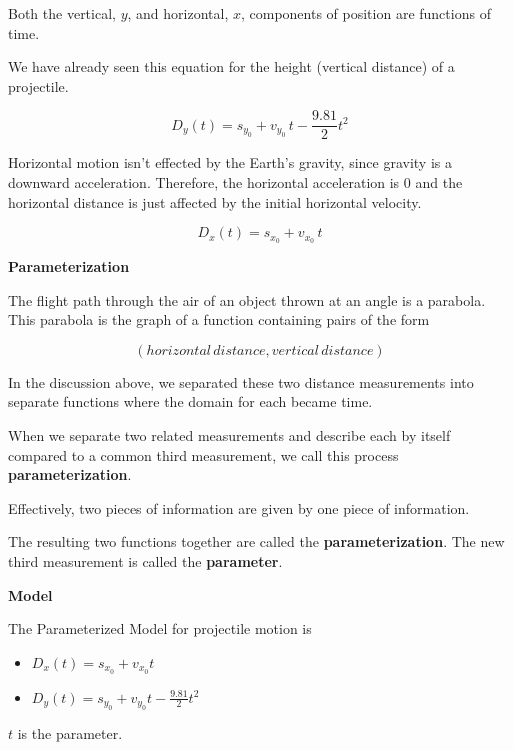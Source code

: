\documentclass{ximera}
\begin{document}
Both the vertical, $y$, and horizontal, $x$, components of position are functions of time.

We have already seen this equation for the height (vertical distance) of a projectile.

\[ 
D_y(t) = s_{y_0} + v_{y_0} \, t - \frac{9.81}{2} t^2  
\]

Horizontal motion isn't effected by the Earth's gravity, since gravity is a downward acceleration. Therefore, the horizontal acceleration is $0$ and the horizontal distance is just affected by the initial horizontal velocity.


\[ 
D_x(t) = s_{x_0} + v_{x_0} \, t  
\]






\begin{definition} \textbf{\textcolor{green!50!black}{Parameterization}} 

The flight path through the air of an object thrown at an angle is a parabola.  This parabola is the graph of a function containing pairs of the form 

\[ (horizontal \, distance, vertical \,distance) \]

In the discussion above, we separated these two distance measurements into separate functions where the domain for each became time.



When we separate two related measurements and describe each by itself compared to a common third measurement, we call this process \textbf{parameterization}.  

Effectively, two pieces of information are given by one piece of information.


The resulting two functions together are called the \textbf{parameterization}.  The new third measurement is called the \textbf{parameter}.






\textbf{\textcolor{purple!30!blue}{Model}} 


The Parameterized Model for projectile motion is


\begin{itemize}
\item $D_x(t) = s_{x_0} + v_{x_0} t$
\item $D_y(t) = s_{y_0} + v_{y_0} t - \frac{9.81}{2} t^2$
\end{itemize}

$t$ is the parameter.





\end{definition}
\end{document}
